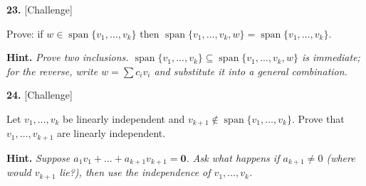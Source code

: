 \documentclass[11pt]{article}
\begin{document}
\begin{minipage}{\linewidth}\textbf{23.} \hfill{\scriptsize\color{ink}[Challenge]}\par\nopagebreak Prove: if $w\in\operatorname{span}\{v_1,\dots,v_k\}$ then $\operatorname{span}\{v_1,\dots,v_k,w\}=\operatorname{span}\{v_1,\dots,v_k\}$.
\par\smallskip\begingroup\small\color{ink}\textbf{Hint.} \textit{Prove two inclusions. $\operatorname{span}\{v_1,\dots,v_k\}\subseteq\operatorname{span}\{v_1,\dots,v_k,w\}$ is immediate; for the reverse, write $w=\sum c_iv_i$ and substitute it into a general combination.}\endgroup
\vspace{5.0cm}\end{minipage}\par\vspace{4pt}
\begin{minipage}{\linewidth}\textbf{24.} \hfill{\scriptsize\color{ink}[Challenge]}\par\nopagebreak Let $v_1,\dots,v_k$ be linearly independent and $v_{k+1}\notin\operatorname{span}\{v_1,\dots,v_k\}$. Prove that $v_1,\dots,v_{k+1}$ are linearly independent.
\par\smallskip\begingroup\small\color{ink}\textbf{Hint.} \textit{Suppose $a_1v_1+\dots+a_{k+1}v_{k+1}=\mathbf 0$. Ask what happens if $a_{k+1}\neq0$ (where would $v_{k+1}$ lie?), then use the independence of $v_1,\dots,v_k$.}\endgroup
\vspace{5.4cm}\end{minipage}\par\vspace{4pt}
\end{document}
